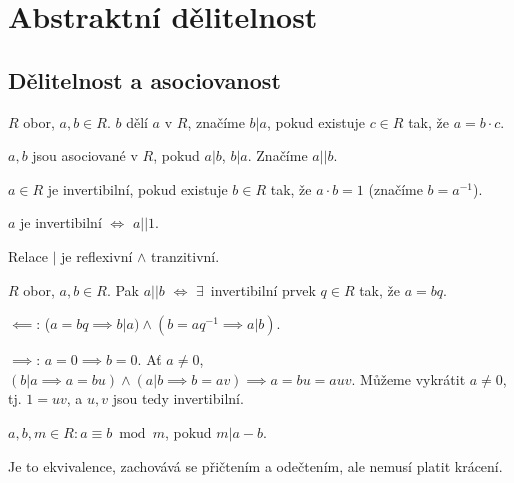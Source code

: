 \documentclass[12pt]{article}                   %
\begin{document}
\section{Abstraktní dělitelnost}
    \subsection{Dělitelnost a asociovanost}
        \begin{definice}
            $R$ obor, $a, b \in R$. $b$ dělí $a$ v $R$, značíme $b|a$, pokud existuje $c \in R$ tak, že $a = b·c$.

            $a, b$ jsou asociované v $R$, pokud $a|b$, $b|a$. Značíme $a||b$.

            $a \in R$ je invertibilní, pokud existuje $b \in R$ tak, že $a·b = 1$ (značíme $b = a^{-1}$).
        \end{definice}

        \begin{pozorovani}
            $a$ je invertibilní $\Leftrightarrow$ $a || 1$.

            Relace $|$ je reflexivní $\land$ tranzitivní.
        \end{pozorovani}

        \begin{tvrzeni}
            $R$ obor, $a, b \in R$. Pak $a||b$ $\Leftrightarrow$ $\exists$~invertibilní prvek $q \in R$ tak, že $a = bq$.

            \begin{dukazin}
                $\impliedby$: ($a = bq \implies b | a) \land (b = aq^{-1} \implies a | b)$.

                $\implies$: $a = 0 \implies b = 0$. Ať $a ≠ 0$, $(b|a \implies a = bu) \land (a|b \implies b=av) \implies a = bu = auv$. Můžeme vykrátit $a ≠ 0$, tj. $1 = uv$, a $u, v$ jsou tedy invertibilní.
            \end{dukazin}
        \end{tvrzeni}

        \begin{definice}[Kongruence]
            $a, b, m \in R: a≡b \bmod m$, pokud $m | a - b$.
        \end{definice}

        \begin{pozorovani}
            Je to ekvivalence, zachovává se přičtením a odečtením, ale nemusí platit krácení.
        \end{pozorovani}
\end{document}
